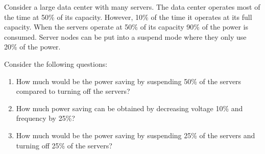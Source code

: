 \begin{acexercise}\end{acexercise}

Consider a large data center with many servers. The data center operates most of 
the time at 50\% of its capacity. However, 10\% of the time it operates at its
full capacity. When the servers operate at 50\% of its capacity 90\% of the power
is consumed. Server nodes can be put into a suspend mode where they only use
20\% of the power.

Consider the following questions:

\begin{enumerate}

\item How much would be the power saving by suspending 50\% of the servers
compared to turning off the servers?

\item How much power saving can be obtained by decreasing voltage 10\% and 
frequency by 25\%?

\item How much would be the power saving by suspending 25\% of the servers
and turning off 25\% of the servers?

\end{enumerate}

\begin{acsolution}\end{acsolution}

